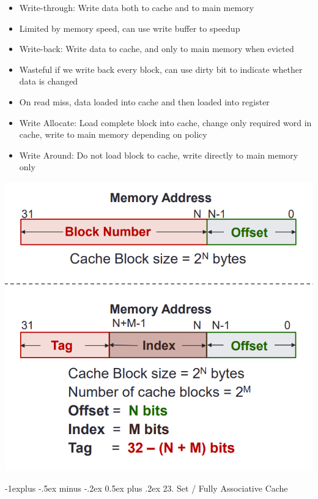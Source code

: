 \documentclass[10pt, portrait]{article}
\makeatletter
\renewcommand{\section}{\@startsection{section}{1}{0mm}%
                                {-1ex plus -.5ex minus -.2ex}%
                                {0.5ex plus .2ex}%
                                {\normalfont\large\bfseries}}
\renewcommand{\section}{\@startsection{section}{2}{0mm}%
                                {-1explus -.5ex minus -.2ex}%
                                {0.5ex plus .2ex}%
                                {\normalfont\normalsize\bfseries}}
\makeatother
\begin{document}
\begin{multicols*}{2}
\begin{itemize}
    \item Write-through: Write data both to cache and to main memory
    \item Limited by memory speed, can use write buffer to speedup
    \item Write-back: Write data to cache, and only to main memory when evicted
    \item Wasteful if we write back every block, can use dirty bit to indicate whether data is changed
    \item On read miss, data loaded into cache and then loaded into register
    \item Write Allocate: Load complete block into cache, change only required word in cache, write to main memory depending on policy
    \item Write Around: Do not load block to cache, write directly to main memory only
\end{itemize}
\begin{center}
    \includegraphics[width=0.8\linewidth]{directcache.png}
\end{center}

\section{23. Set / Fully Associative Cache}

\end{multicols*}
\end{document}
